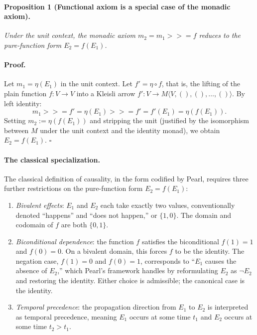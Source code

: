 \paragraph{Proposition 1 (Functional axiom is a special case of the monadic axiom).}
\emph{Under the unit context, the monadic axiom $m_2 = m_1 \mathbin{>\!\!>\!\!=} f$ reduces to the pure-function form $E_2 = f(E_1)$.}
 
\paragraph{Proof.}
Let $m_1 = \eta(E_1)$ in the unit context. Let $f' = \eta \circ f$, that is, the lifting of the plain function $f : V \to V$ into a Kleisli arrow $f' : V \to M\langle V, (), (), \ldots, () \rangle$. By left identity:
\[
m_1 \mathbin{>\!\!>\!\!=} f' = \eta(E_1) \mathbin{>\!\!>\!\!=} f' = f'(E_1) = \eta(f(E_1)).
\]
Setting $m_2 := \eta(f(E_1))$ and stripping the unit (justified by the isomorphism between $M$ under the unit context and the identity monad), we obtain $E_2 = f(E_1)$. $\square$
 
\paragraph{The classical specialization.}
The classical definition of causality, in the form codified by Pearl\cite{pearl2000causality}, requires three further restrictions on the pure-function form $E_2 = f(E_1)$:
 
\begin{enumerate}
\item \emph{Bivalent effects}: $E_1$ and $E_2$ each take exactly two values, conventionally denoted ``happens'' and ``does not happen,'' or $\{1, 0\}$. The domain and codomain of $f$ are both $\{0, 1\}$.
 
\item \emph{Biconditional dependence}: the function $f$ satisfies the biconditional $f(1) = 1$ and $f(0) = 0$. On a bivalent domain, this forces $f$ to be the identity. The negation case, $f(1) = 0$ and $f(0) = 1$, corresponds to ``$E_1$ causes the absence of $E_2$,'' which Pearl's framework handles by reformulating $E_2$ as $\neg E_2$ and restoring the identity. Either choice is admissible; the canonical case is the identity.
 
\item \emph{Temporal precedence}: the propagation direction from $E_1$ to $E_2$ is interpreted as temporal precedence, meaning $E_1$ occurs at some time $t_1$ and $E_2$ occurs at some time $t_2 > t_1$.
\end{enumerate}

